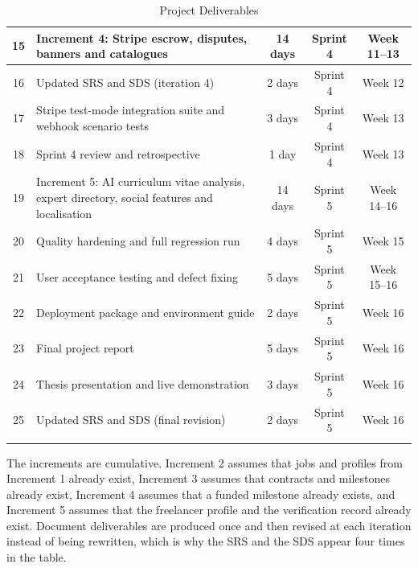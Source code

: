 \begin{longtable}{|c|p{6.2cm}|c|c|c|}
15 & Increment 4: Stripe escrow, disputes, banners and catalogues & 14 days & Sprint 4 & Week 11--13 \\ \hline
16 & Updated SRS and SDS (iteration 4) & 2 days & Sprint 4 & Week 12 \\ \hline
17 & Stripe test-mode integration suite and webhook scenario tests & 3 days & Sprint 4 & Week 13 \\ \hline
18 & Sprint 4 review and retrospective & 1 day & Sprint 4 & Week 13 \\ \hline

19 & Increment 5: AI curriculum vitae analysis, expert directory, social features and localisation & 14 days & Sprint 5 & Week 14--16 \\ \hline
20 & Quality hardening and full regression run & 4 days & Sprint 5 & Week 15 \\ \hline
21 & User acceptance testing and defect fixing & 5 days & Sprint 5 & Week 15--16 \\ \hline
22 & Deployment package and environment guide & 2 days & Sprint 5 & Week 16 \\ \hline
23 & Final project report & 5 days & Sprint 5 & Week 16 \\ \hline
24 & Thesis presentation and live demonstration & 3 days & Sprint 5 & Week 16 \\ \hline
25 & Updated SRS and SDS (final revision) & 2 days & Sprint 5 & Week 16 \\ \hline

\caption{Project Deliverables}
\label{tab:deliverables}
\end{longtable}

The increments are cumulative. Increment 2 assumes that jobs and profiles from Increment 1 already exist, Increment 3 assumes that contracts and milestones already exist, Increment 4 assumes that a funded milestone already exists, and Increment 5 assumes that the freelancer profile and the verification record already exist. Document deliverables are produced once and then revised at each iteration instead of being rewritten, which is why the SRS and the SDS appear four times in the table.
